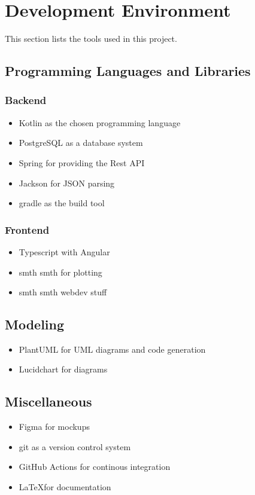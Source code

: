\section{Development Environment}

This section lists the tools used in this project.

\subsection{Programming Languages and Libraries}

\subsubsection*{Backend}
\begin{itemize}
    \item Kotlin as the chosen programming language
    \item PostgreSQL as a database system
    \item Spring for providing the Rest API
    \item Jackson for JSON parsing
    \item gradle as the build tool
\end{itemize}

\subsubsection*{Frontend}
\begin{itemize}
    \item Typescript with Angular
    \item smth smth for plotting
    \item smth smth webdev stuff
\end{itemize}

\subsection{Modeling}
\begin{itemize}
    \item PlantUML for UML diagrams and code generation
    \item Lucidchart for diagrams
\end{itemize}

\subsection{Miscellaneous}
\begin{itemize}
    \item Figma for mockups
    \item git as a version control system
    \item GitHub Actions for continous integration
    \item \LaTeX for documentation
\end{itemize}
